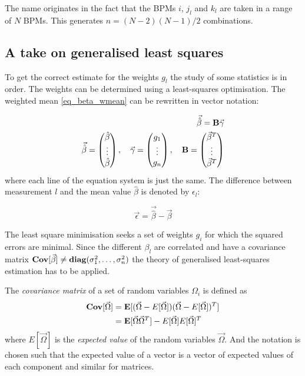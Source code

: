 The name originates in the fact that the BPMs $i$, $j_l$ and $k_l$ are taken in a range of $N$ BPMs.
This generates $n = (N-2)(N-1)/2$ combinations.


\subsection{A take on generalised least squares}

To get the correct estimate for the weights $g_l$ the study of some statistics is in order.
The weights can be determined using a least-squares optimisation. The weighted mean \eqref{eq_beta_wmean}
can be rewritten in vector notation:

\begin{align}
    \vec{\hat{\beta}} = \mathbf{B}\vec{\gamma}
    \label{eq_beta_wmean_vec}\\
    \vec{\hat{\beta}} = 
    \begin{pmatrix}
        \hat{\beta}\\
        \vdots\\
        \hat{\beta}
    \end{pmatrix},\quad
    \vec{\gamma} =
    \begin{pmatrix}
        g_1\\
        \vdots\\
        g_n
    \end{pmatrix},\quad
    \mathbf{B} =
    \begin{pmatrix}
        \vec{\beta}^T\\
        \vdots\\
        \vec{\beta}^T
    \end{pmatrix}
\end{align}
where each line of the equation system is just the same.
The difference between measurement $l$ and the mean value $\hat{\beta}$ is denoted by $\epsilon_l$:

\begin{equation}
    \vec{\epsilon} = \vec{\hat{\beta}} - \vec{\beta}
\end{equation}

The least square minimisation seeks a set of weights $g_i$ for which the squared errors are minimal. Since the different $\beta_l$
are correlated and have a covariance matrix $\mathbf{Cov}[\vec{\beta}] \neq \mathbf{diag}(\sigma_1^2, \ldots, \sigma_n^2)$
the theory of generalised least-squares estimation has to be applied.

The \emph{covariance matrix} of a set of random variables $\Omega_i$ is defined as
\begin{align}
    \mathbf{Cov}[\vec{\Omega}] &= \mathbf{E}[(\vec{\Omega} - E[\vec{\Omega}])(\vec{\Omega} - E[\vec{\Omega}])^T]
    \notag \\
    &= \mathbf{E}[\vec{\Omega}\vec{\Omega}^T] - E[\vec{\Omega}]E[\vec{\Omega}]^T
    \label{eq_def_cov}
\end{align}
where $E[\vec{\Omega}]$ is the \emph{expected value} of the random variables $\vec{\Omega}$. And the
notation is chosen such that the expected value of a vector is a vector
of expected values of each component and similar for matrices.

